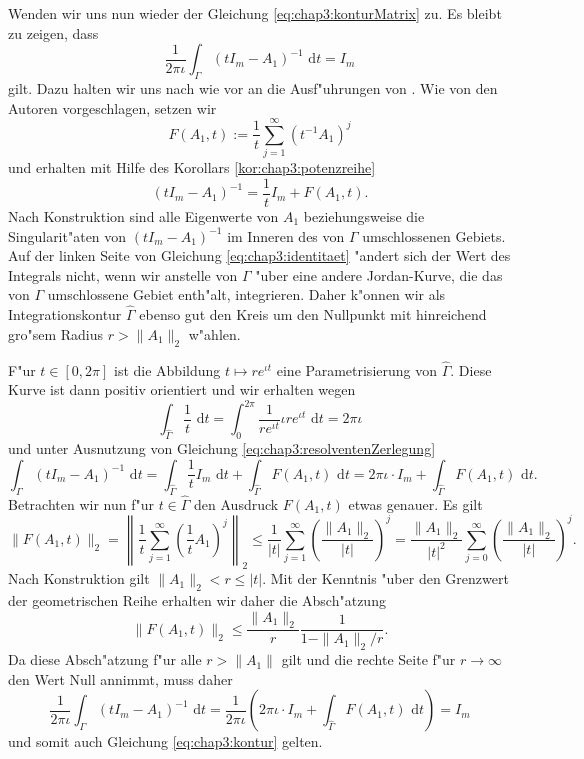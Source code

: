 Wenden wir uns nun wieder der Gleichung \eqref{eq:chap3:konturMatrix} zu. Es bleibt zu zeigen, dass
\begin{equation}\label{eq:chap3:identitaet}
\frac{1}{2\pi\iota}\int_\Gamma (t I_m - A_1)^{-1} \text{ d}t = I_m
\end{equation}
gilt. Dazu halten wir uns nach wie vor an die Ausf"uhrungen von \cite[Abschnitt 4.9]{liesen}. Wie von den Autoren vorgeschlagen, setzen wir
\[
F(A_1,t) := \frac{1}{t}\sum_{j=1}^\infty(t^{-1}A_1)^j
\]
und erhalten mit Hilfe des Korollars \ref{kor:chap3:potenzreihe}
\begin{equation}\label{eq:chap3:resolventenZerlegung}
(t I_m - A_1)^{-1} = \frac{1}{t} I_m + F(A_1,t).
\end{equation}
Nach Konstruktion sind alle Eigenwerte von $A_1$ beziehungsweise die Singularit"aten von $(t I_m - A_1)^{-1}$ im Inneren des von $\Gamma$ umschlossenen Gebiets. Auf der linken Seite von Gleichung \eqref{eq:chap3:identitaet} "andert sich der Wert des Integrals nicht, wenn wir anstelle von $\Gamma$ "uber eine
andere Jordan-Kurve, die das von $\Gamma$ umschlossene Gebiet enth"alt, integrieren. Daher k"onnen wir als Integrationskontur  $\widehat{\Gamma}$ ebenso gut den Kreis um den Nullpunkt mit hinreichend gro"sem Radius $r > \|A_1\|_2$
w"ahlen.

\newpage

F"ur $t\in[0,2\pi]$ ist die Abbildung $t\mapsto re^{\iota t}$ eine Parametrisierung von $\widehat{\Gamma}$. Diese Kurve ist dann positiv orientiert und wir erhalten wegen
\[
\int_{\widehat{\Gamma}} \frac{1}{t} \text{ d}t = \int_0^{2\pi}\frac{1}{r e^{\iota t}} \iota r e^{\iota t} \text{ d}t = 2\pi \iota
\]
und unter Ausnutzung von Gleichung \eqref{eq:chap3:resolventenZerlegung}
\[
\int_\Gamma (t I_m - A_1)^{-1} \text{ d}t =
\int_{\widehat{\Gamma}} \frac{1}{t}I_m
\text{ d}t
+ \int_{\widehat{\Gamma}} F(A_1,t) \text{ d}t
= 2\pi\iota \cdot I_m + \int_{\widehat{\Gamma}} F(A_1,t) \text{ d}t.
\]
Betrachten wir nun f"ur $t \in\widehat{\Gamma}$ den Ausdruck $F(A_1,t)$ etwas genauer.
Es gilt
\[
\|F(A_1,t)\|_2 =
\left\| \frac{1}{t} \sum_{j=1}^\infty \left( \frac{1}{t} A_1 \right)^j \right\|_2
\le \frac{1}{|t|} \sum_{j=1}^\infty \left(\frac{\|A_1\|_2}{|t|} \right)^j
= \frac{\|A_1\|_2}{|t|^2}\sum_{j=0}^\infty \left(\frac{\|A_1\|_2}{|t|} \right)^j.
\]
Nach Konstruktion gilt $\|A_1\|_2 < r \le |t|$.
Mit der Kenntnis "uber den Grenzwert der geometrischen Reihe erhalten wir daher die Absch"atzung
\[
\|F(A_1,t)\|_2 \le \frac{\| A_1 \|_2}{r}
\frac{1}{1-\|A_1\|_2 / r}.
\]
Da diese Absch"atzung f"ur alle $r > \|A_1\|$ gilt und die rechte Seite f"ur $r\to\infty$ den Wert Null annimmt, muss daher
\[
\frac{1}{2\pi\iota}\int_\Gamma (t I_m - A_1)^{-1} \text{ d}t =
 \frac{1}{2\pi\iota} \left(2\pi\iota \cdot I_m + \int_{\widehat{\Gamma}} F(A_1,t) \text{ d}t\right)
= I_m
\]
und somit auch Gleichung \eqref{eq:chap3:kontur} gelten.\\

